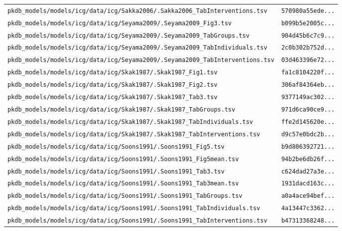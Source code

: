 \documentclass{article}
\begin{document}
\begin{longtable}{ll}
\texttt{pkdb\_models/models/icg/data/icg/Sakka2006/.Sakka2006\_TabInterventions.tsv} & \texttt{570980a55ede...} \\
\texttt{pkdb\_models/models/icg/data/icg/Seyama2009/.Seyama2009\_Fig3.tsv} & \texttt{b099b5e2005c...} \\
\texttt{pkdb\_models/models/icg/data/icg/Seyama2009/.Seyama2009\_TabGroups.tsv} & \texttt{904d45b6c7c9...} \\
\texttt{pkdb\_models/models/icg/data/icg/Seyama2009/.Seyama2009\_TabIndividuals.tsv} & \texttt{2c0b302b752d...} \\
\texttt{pkdb\_models/models/icg/data/icg/Seyama2009/.Seyama2009\_TabInterventions.tsv} & \texttt{03d463396e72...} \\
\texttt{pkdb\_models/models/icg/data/icg/Skak1987/.Skak1987\_Fig1.tsv} & \texttt{fa1c8104220f...} \\
\texttt{pkdb\_models/models/icg/data/icg/Skak1987/.Skak1987\_Fig2.tsv} & \texttt{306af84364eb...} \\
\texttt{pkdb\_models/models/icg/data/icg/Skak1987/.Skak1987\_Tab3.tsv} & \texttt{9377149ac302...} \\
\texttt{pkdb\_models/models/icg/data/icg/Skak1987/.Skak1987\_TabGroups.tsv} & \texttt{971d6ca90ce9...} \\
\texttt{pkdb\_models/models/icg/data/icg/Skak1987/.Skak1987\_TabIndividuals.tsv} & \texttt{ffe2d145620e...} \\
\texttt{pkdb\_models/models/icg/data/icg/Skak1987/.Skak1987\_TabInterventions.tsv} & \texttt{d9c57e0bdc2b...} \\
\texttt{pkdb\_models/models/icg/data/icg/Soons1991/.Soons1991\_Fig5.tsv} & \texttt{b9d806392721...} \\
\texttt{pkdb\_models/models/icg/data/icg/Soons1991/.Soons1991\_Fig5mean.tsv} & \texttt{94b2be6db26f...} \\
\texttt{pkdb\_models/models/icg/data/icg/Soons1991/.Soons1991\_Tab3.tsv} & \texttt{c624dad27a3e...} \\
\texttt{pkdb\_models/models/icg/data/icg/Soons1991/.Soons1991\_Tab3mean.tsv} & \texttt{1931dacd163c...} \\
\texttt{pkdb\_models/models/icg/data/icg/Soons1991/.Soons1991\_TabGroups.tsv} & \texttt{a0a4ace94bef...} \\
\texttt{pkdb\_models/models/icg/data/icg/Soons1991/.Soons1991\_TabIndividuals.tsv} & \texttt{4a13447c3362...} \\
\texttt{pkdb\_models/models/icg/data/icg/Soons1991/.Soons1991\_TabInterventions.tsv} & \texttt{b47313368248...} \\

\end{longtable}
\end{document}
